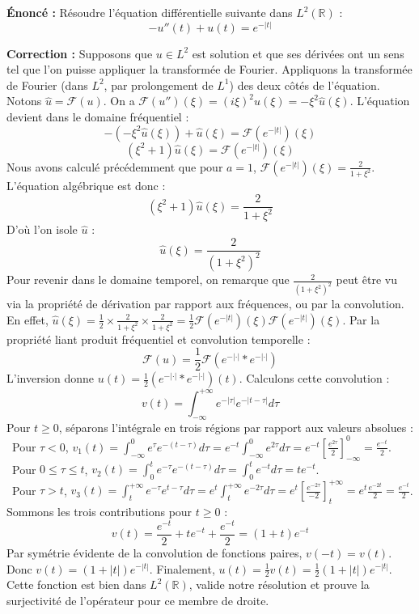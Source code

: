 \documentclass[11pt,a4paper]{article}
\begin{document}
\textbf{Énoncé :}
Résoudre l'équation différentielle suivante dans $L^2(\mathbb{R})$ :
$$ -u''(t) + u(t) = e^{-|t|} $$

\textbf{Correction :}
Supposons que $u \in L^2$ est solution et que ses dérivées ont un sens tel que l'on puisse appliquer la transformée de Fourier.
Appliquons la transformée de Fourier (dans $L^2$, par prolongement de $L^1$) des deux côtés de l'équation.
Notons $\hat{u} = \mathcal{F}(u)$.
On a $\mathcal{F}(u'')(\xi) = (i\xi)^2 \hat{u}(\xi) = -\xi^2 \hat{u}(\xi)$.
L'équation devient dans le domaine fréquentiel :
$$ -(-\xi^2 \hat{u}(\xi)) + \hat{u}(\xi) = \mathcal{F}(e^{-|t|})(\xi) $$
$$ (\xi^2 + 1)\hat{u}(\xi) = \mathcal{F}(e^{-|t|})(\xi) $$
Nous avons calculé précédemment que pour $a=1$, $\mathcal{F}(e^{-|t|})(\xi) = \frac{2}{1+\xi^2}$.
L'équation algébrique est donc :
$$ (\xi^2 + 1)\hat{u}(\xi) = \frac{2}{1+\xi^2} $$
D'où l'on isole $\hat{u}$ :
$$ \hat{u}(\xi) = \frac{2}{(1+\xi^2)^2} $$
Pour revenir dans le domaine temporel, on remarque que $\frac{2}{(1+\xi^2)^2}$ peut être vu via la propriété de dérivation par rapport aux fréquences, ou par la convolution.
En effet, $\hat{u}(\xi) = \frac{1}{2} \times \frac{2}{1+\xi^2} \times \frac{2}{1+\xi^2} = \frac{1}{2} \mathcal{F}(e^{-|t|})(\xi) \mathcal{F}(e^{-|t|})(\xi)$.
Par la propriété liant produit fréquentiel et convolution temporelle :
$$ \mathcal{F}(u) = \frac{1}{2} \mathcal{F}(e^{-|\cdot|} * e^{-|\cdot|}) $$
L'inversion donne $u(t) = \frac{1}{2} (e^{-|\cdot|} * e^{-|\cdot|})(t)$.
Calculons cette convolution :
$$ v(t) = \int_{-\infty}^{+\infty} e^{-|\tau|} e^{-|t-\tau|} d\tau $$
Pour $t \ge 0$, séparons l'intégrale en trois régions par rapport aux valeurs absolues :
\textbullet\ Pour $\tau < 0$, $v_1(t) = \int_{-\infty}^0 e^\tau e^{-(t-\tau)} d\tau = e^{-t} \int_{-\infty}^0 e^{2\tau} d\tau = e^{-t} \left[\frac{e^{2\tau}}{2}\right]_{-\infty}^0 = \frac{e^{-t}}{2}$. \\
\textbullet\ Pour $0 \le \tau \le t$, $v_2(t) = \int_0^t e^{-\tau} e^{-(t-\tau)} d\tau = \int_0^t e^{-t} d\tau = t e^{-t}$. \\
\textbullet\ Pour $\tau > t$, $v_3(t) = \int_t^{+\infty} e^{-\tau} e^{t-\tau} d\tau = e^t \int_t^{+\infty} e^{-2\tau} d\tau = e^t \left[ \frac{e^{-2\tau}}{-2} \right]_t^{+\infty} = e^t \frac{e^{-2t}}{2} = \frac{e^{-t}}{2}$. \\
Sommons les trois contributions pour $t \ge 0$ :
$$ v(t) = \frac{e^{-t}}{2} + t e^{-t} + \frac{e^{-t}}{2} = (1+t)e^{-t} $$
Par symétrie évidente de la convolution de fonctions paires, $v(-t) = v(t)$.
Donc $v(t) = (1+|t|)e^{-|t|}$.
Finalement, $u(t) = \frac{1}{2} v(t) = \frac{1}{2} (1+|t|)e^{-|t|}$.
Cette fonction est bien dans $L^2(\mathbb{R})$, valide notre résolution et prouve la surjectivité de l'opérateur pour ce membre de droite.
\end{document}
